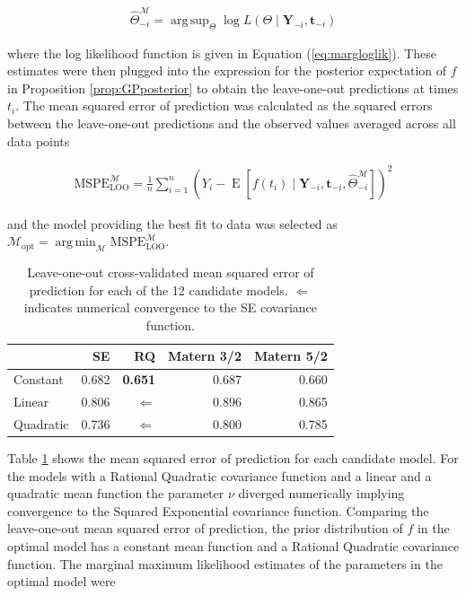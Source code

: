 \documentclass[11pt,]{article}
\DeclareMathOperator*{\argsup}{arg\,sup}
\DeclareMathOperator*{\argmin}{arg\,min}
\DeclareMathOperator*{\E}{E}
\theoremstyle{nonumberplain}
\begin{document}
\begin{align*}
\widehat{\Theta}_{-i}^\mathcal{M} = \argsup_{\Theta} \log L(\Theta \mid \mathbf{Y}_{-i}, \mathbf{t}_{-i}) 
\end{align*}

where the log likelihood function is given in Equation
(\ref{eq:margloglik}). These estimates were then plugged into the
expression for the posterior expectation of \(f\) in Proposition
\ref{prop:GPposterior} to obtain the leave-one-out predictions at times
\(t_i\). The mean squared error of prediction was calculated as the
squared errors between the leave-one-out predictions and the observed
values averaged across all data points

\begin{align*}
  \text{MSPE}_{\text{LOO}}^\mathcal{M} = \frac{1}{n}\sum_{i=1}^{n} \left(Y_i - \E[f(t_i) \mid \mathbf{Y}_{-i}, \mathbf{t}_{-i}, \widehat{\Theta}_{-i}^\mathcal{M}]\right)^2
\end{align*}

and the model providing the best fit to data was selected as
\(\mathcal{M}_{\text{opt}} = \argmin_\mathcal{M} \text{MSPE}_{\text{LOO}}^\mathcal{M}\).

\begin{table}[htbp]
\center
\begin{tabular}{l|rrrr}
 & SE & RQ & Matern 3/2 & Matern 5/2\\ \hline
Constant & 0.682 & \textbf{0.651} & 0.687 & 0.660\\
Linear & 0.806 & $\Leftarrow    $ & 0.896 & 0.865\\
Quadratic & 0.736 & $\Leftarrow$ & 0.800 & 0.785
\end{tabular}
\caption{Leave-one-out cross-validated mean squared error of prediction for each of the 12 candidate models. $\Leftarrow$ indicates numerical convergence to the SE covariance function.}
\label{tab:looTale}
\end{table}

Table \ref{tab:looTale} shows the mean squared error of prediction for
each candidate model. For the models with a Rational Quadratic
covariance function and a linear and a quadratic mean function the
parameter \(\nu\) diverged numerically implying convergence to the
Squared Exponential covariance function. Comparing the leave-one-out
mean squared error of prediction, the prior distribution of \(f\) in the
optimal model has a constant mean function and a Rational Quadratic
covariance function. The marginal maximum likelihood estimates of the
parameters in the optimal model were
\end{document}
